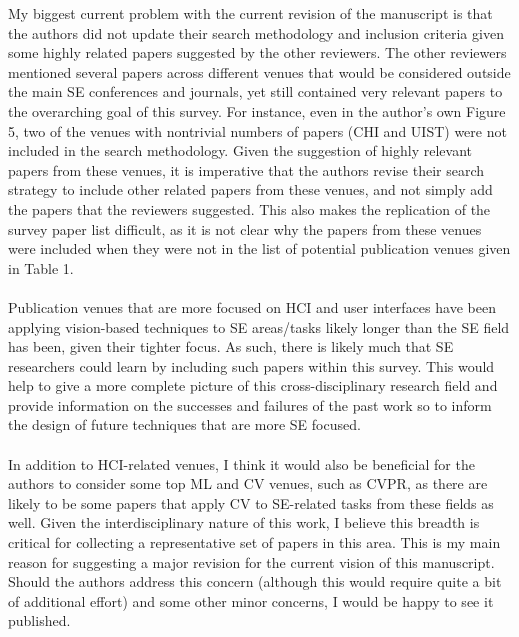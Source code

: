 \documentclass[12pt]{article}
\begin{document}
My biggest current problem 
with the current revision of the manuscript 
is that the authors did not update their 
search methodology and inclusion criteria 
given some highly related papers 
suggested by the other reviewers. 
The other reviewers mentioned several papers 
across different venues that would be considered 
outside the main SE conferences and journals, 
yet still contained very relevant papers 
to the overarching goal of this survey. 
For instance, even in the author’s own Figure 5, 
two of the venues with nontrivial 
numbers of papers (CHI and UIST) 
were not included in the search methodology. 
Given the suggestion of highly relevant papers 
from these venues, it is imperative that the authors 
revise their search strategy to include 
other related papers from these venues, 
and not simply add the papers that the reviewers 
suggested. This also makes the replication 
of the survey paper list difficult, as it is 
not clear why the papers from these venues 
were included when they were not in the list of 
potential publication venues given in Table 1. 
\\ \\
Publication venues that are more focused on 
HCI and user interfaces have been applying vision-based 
techniques to SE areas/tasks likely longer than 
the SE field has been, given their tighter focus. 
As such, there is likely much that SE researchers 
could learn by including such papers within this survey. 
This would help to give a more complete picture of this 
cross-disciplinary research field and provide 
information on the successes and failures of the past 
work so to inform the design of future techniques that 
are more SE focused. 
\\ \\ 
In addition to HCI-related venues, I think it would also 
be beneficial for the authors to consider some top ML 
and CV venues, such as CVPR, as there are likely to be 
some papers that apply CV to SE-related tasks from these 
fields as well. Given the interdisciplinary nature of 
this work, I believe this breadth is critical for 
collecting a representative set of papers in this area. 
This is my main reason for suggesting a major revision 
for the current vision of this manuscript. Should the 
authors address this concern (although this would 
require quite a bit of additional effort) and some other 
minor concerns, I would be happy to see it published.
\end{document}
